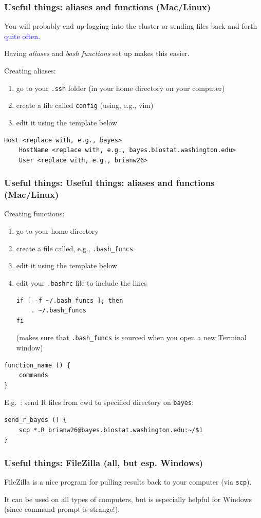 \documentclass[12pt, 
hyperref={colorlinks=true, linkcolor=BlueViolet, urlcolor=BlueViolet},dvipsnames]{beamer}
\begin{document}
\begin{frame}[fragile]
\frametitle{Useful things: aliases and functions (Mac/Linux)}
You will probably end up logging into the cluster or sending files back and forth \textcolor{blue}{quite often}.

Having \textit{aliases} and \textit{bash functions} set up makes this easier.

Creating aliases: \vspace{-0.3cm} 
\begin{enumerate}
\item go to your \texttt{.ssh} folder (in your home directory on your computer)
\item create a file called \texttt{config} (using, e.g., vim)
\item edit it using the template below
\end{enumerate} \vspace{-0.3cm}
{\scriptsize
\begin{verbatim}
Host <replace with, e.g., bayes>
    HostName <replace with, e.g., bayes.biostat.washington.edu>
    User <replace with, e.g., brianw26>
\end{verbatim}
}
\end{frame}

\begin{frame}[fragile]
\frametitle{Useful things: Useful things: aliases and functions (Mac/Linux)}
Creating functions: \vspace{-0.3cm} 
\begin{enumerate}
\item go to your home directory
\item create a file called, e.g., \texttt{.bash\_funcs}
\item edit it using the template below
\item edit your \texttt{.bashrc} file to include the lines \vspace{-0.1cm}
{\scriptsize
\begin{verbatim}
if [ -f ~/.bash_funcs ]; then
    . ~/.bash_funcs
fi
\end{verbatim}
}
(makes sure that \texttt{.bash\_funcs} is sourced when you open a new Terminal window)
\end{enumerate} \vspace{-0.3cm}
{\scriptsize
\begin{verbatim}
function_name () {
    commands
}
\end{verbatim}
}

E.g.~: send R files from cwd to specified directory on \texttt{bayes}: \vspace{-0.3cm}
{\scriptsize
\begin{verbatim}
send_r_bayes () {
    scp *.R brianw26@bayes.biostat.washington.edu:~/$1
}
\end{verbatim}
}
\end{frame}

\begin{frame}
\frametitle{Useful things: FileZilla (all, but esp. Windows)}
FileZilla is a nice program for pulling results back to your computer (via \texttt{scp}). 

It can be used on all types of computers, but is especially helpful for Windows (since command prompt is strange!).
\end{frame}
\end{document}
